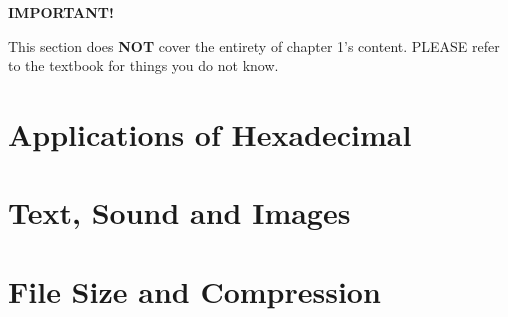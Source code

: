 \documentclass[../main.tex]{subfiles}
\begin{document}
{\LARGE \textbf{IMPORTANT!}}

This section does \textbf{NOT} cover the entirety of chapter 1's content. PLEASE refer to the textbook for things you do not know.

\section{Applications of Hexadecimal}
\label{1:sec:applications-of-hexadecimal}


\section{Text, Sound and Images}
\label{1:sec:text_sound_and_images}


\section{File Size and Compression}
\label{1:sec:file_size_and_compression}

\end{document}
